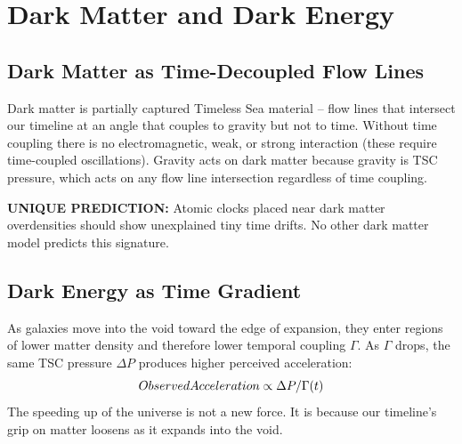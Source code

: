\documentclass[11pt,a4paper]{article}
\def\frac#1#2{#1/#2} \def\phantom#1{} \def\ensuremath#1{#1}
\let\text\relax \let\mathrm\relax \let\mathbf\relax \let\mathcal\relax
\begin{document}
\section{Dark Matter and Dark Energy}
\subsection{Dark Matter as Time-Decoupled Flow Lines}
Dark matter is partially captured Timeless Sea material -- flow lines that intersect our timeline at an angle that couples to gravity but not to time. Without time coupling there is no electromagnetic, weak, or strong interaction (these require time-coupled oscillations). Gravity acts on dark matter because gravity is TSC pressure, which acts on any flow line intersection regardless of time coupling.

\noindent\textbf{UNIQUE PREDICTION:} Atomic clocks placed near dark matter overdensities should show unexplained tiny time drifts. No other dark matter model predicts this signature.

\subsection{Dark Energy as Time Gradient}
As galaxies move into the void toward the edge of expansion, they enter regions of lower matter density and therefore lower temporal coupling $\Gamma$. As $\Gamma$ drops, the same TSC pressure $\Delta P$ produces higher perceived acceleration:
\begin{equation}
\text{Observed Acceleration} \propto \frac{\Delta P}{\Gamma(t)}
\end{equation}
The speeding up of the universe is not a new force. It is because our timeline's grip on matter loosens as it expands into the void.
\end{document}
